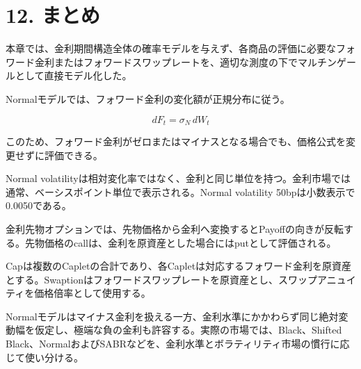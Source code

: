 \documentclass[
  letterpaper,
  DIV=11,
  numbers=noendperiod]{scrreprt}
\begin{document}
\section{12. まとめ}\label{ux307eux3068ux3081-3}

本章では、金利期間構造全体の確率モデルを与えず、各商品の評価に必要なフォワード金利またはフォワードスワップレートを、適切な測度の下でマルチンゲールとして直接モデル化した。

Normalモデルでは、フォワード金利の変化額が正規分布に従う。

\[
dF_t
=
\sigma_N\,dW_t
\]

このため、フォワード金利がゼロまたはマイナスとなる場合でも、価格公式を変更せずに評価できる。

Normal
volatilityは相対変化率ではなく、金利と同じ単位を持つ。金利市場では通常、ベーシスポイント単位で表示される。Normal
volatility 50bpは小数表示で0.0050である。

金利先物オプションでは、先物価格から金利へ変換するとPayoffの向きが反転する。先物価格のcallは、金利を原資産とした場合にはputとして評価される。

Capは複数のCapletの合計であり、各Capletは対応するフォワード金利を原資産とする。Swaptionはフォワードスワップレートを原資産とし、スワップアニュイティを価格倍率として使用する。

Normalモデルはマイナス金利を扱える一方、金利水準にかかわらず同じ絶対変動幅を仮定し、極端な負の金利も許容する。実際の市場では、Black、Shifted
Black、NormalおよびSABRなどを、金利水準とボラティリティ市場の慣行に応じて使い分ける。
\end{document}
